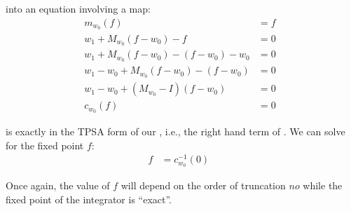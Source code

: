 \documentclass{hitec}     %
\begin{document}
{{{{{ into an equation involving a map:
%
\begin{subequations}\begin{align}  {m}_{{w}_{0}}\left({f}\right)&=f\nonumber \\
 {w}_{1}+{M}_{{w}_{0}}(f-{w}_{0})-f&=0~\label{eq:fixpeqtpsa}\\  {w}_{1}+{M}_{{w}_{0}}\left({f-{w}_{0}}\right)- \left({f-{w}_{0}}\right)-{w}_{0}&=0\nonumber \\
 {w}_{1}-{w}_{0}+{M}_{{w}_{0}}\left({f-{w}_{0}}\right)-\left({f-{w}_{0}}\right)&=0\ \nonumber \\
 {w}_{1}-{w}_{0}+\left({{M}_{{w}_{0}}-I}\right)\left({f-{w}_{0}}\right)&=0 \label{eq:cw0}\\  {c}_{{w}_{0}}\left({f}\right)&=0\ \label{eq:fmaptpsa} \  \end{align}\end{subequations}



 is exactly in the TPSA form of our , i.e., the right hand term of .  We can solve for the fixed point $f$:
%
\begin{eqnarray}f&={c}_{{w}_{0}}^{-1}\left({0}\right)\ \ \ \label{eq:fp0}\end{eqnarray}
%

Once again, the value of $f$ will depend on the order of truncation $no$ while the fixed point of the integrator is ``exact''.

}}}}}
\end{document}
